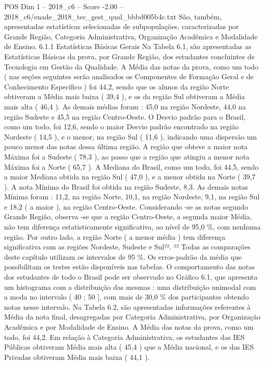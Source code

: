 \begin{textsample}{POS Dim 1 – 2018\_c6 – Score -2.00 – 2018\_c6/enade\_2018\_tec\_gest\_qual\_bbbd005b4c.txt}
São, também, apresentadas estatísticas selecionadas de subpopulações, caracterizadas por Grande Região, Categoria Administrativa, Organização Acadêmica e Modalidade de Ensino. 6.1.1 Estatísticas Básicas Gerais Na Tabela 6.1, são apresentadas as Estatísticas Básicas da prova, por Grande Região, dos estudantes concluintes de Tecnologia em Gestão da Qualidade.
A Média das notas da prova, como um todo ( nas seções seguintes serão analisados os Componentes de Formação Geral e de Conhecimento Específico ) foi 44,2, sendo que os alunos da região Norte obtiveram a Média mais baixa ( 39,4 ), e os da região Sul obtiveram a Média mais alta ( 46,4 ).
As demais médias foram : 45,0 na região Nordeste, 44,0 na região Sudeste e 45,5 na região Centro-Oeste.
O Desvio padrão para o Brasil, como um todo, foi 12,6, sendo o maior Desvio padrão encontrado na região Nordeste ( 14,5 ), e o menor, na região Sul ( 11,6 ), indicando uma dispersão um pouco menor das notas dessa última região.
A região que obteve a maior nota Máxima foi a Sudeste ( 78,3 ), ao passo que a região que atingiu a menor nota Máxima foi a Norte ( 65,7 ).
A Mediana do Brasil, como um todo, foi 44,5, sendo a maior Mediana obtida na região Sul ( 47,0 ), e a menor obtida na Norte ( 39,7 ).
A nota Mínima do Brasil foi obtida na região Sudeste, 8,3.
As demais notas Mínima foram : 11,2, na região Norte, 10,1, na região Nordeste, 9,1, na região Sul e 18,2 ( a maior ), na região Centro-Oeste.
Considerando -se as notas segundo Grande Região, observa -se que a região Centro-Oeste, a segunda maior Média, não tem diferença estatisticamente significativa, ao nível de 95,0 \%, com nenhuma região.
Por outro lado, a região Norte ( a menor média ) tem diferença significativa com as regiões Nordeste, Sudeste e Sul²². ²² Todas as comparações deste capítulo utilizam os intervalos de 95 \%.
Os erros-padrão da média que possibilitam os testes estão disponíveis nas tabelas.
O comportamento das notas dos estudantes de todo o Brasil pode ser observado no Gráfico 6.1, que apresenta um histograma com a distribuição das mesmas : uma distribuição unimodal com a moda no intervalo ( 40 ; 50 ], com mais de 30,0 \% dos participantes obtendo notas nesse intervalo.
Na Tabela 6.2, são apresentadas informações referentes à Média da nota final, desagregadas por Categoria Administrativa, por Organização Acadêmica e por Modalidade de Ensino.
A Média das notas da prova, como um todo, foi 44,2.
Em relação à Categoria Administrativa, os estudantes das IES Públicas obtiveram Média mais alta ( 45,4 ) que a Média nacional, e os das IES Privadas obtiveram Média mais baixa ( 44,1 ).

\end{textsample}

